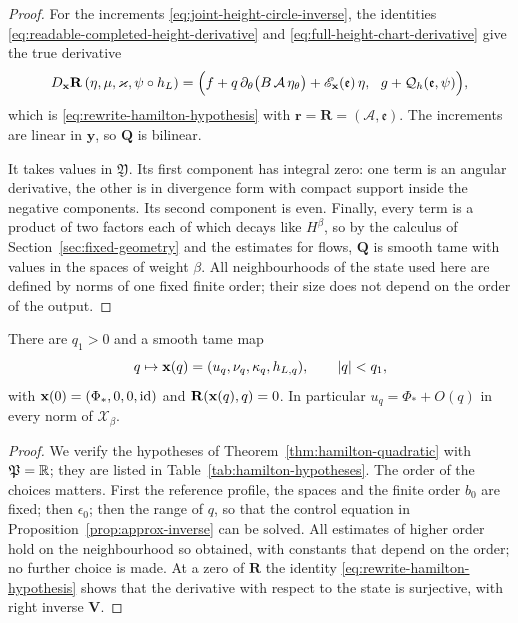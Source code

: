 \begin{proof}
For the increments \eqref{eq:joint-height-circle-inverse}, the
identities \eqref{eq:readable-completed-height-derivative} and
\eqref{eq:full-height-chart-derivative} give the true derivative
\begin{equation}\label{eq:joint-height-circle-quadratic-error}
 D_{\mathbf x}\mathbf R\,(\eta,\mu,\varkappa,\psi\circ h_L)
 =\Bigl(f+q\,\partial_\theta\bigl(B\,\mathcal A\,\eta_\theta\bigr)
              +\mathscr E_{\mathbf x}(\mathfrak e)\,\eta,\ \
        g+\mathcal Q_h(\mathfrak e,\psi)\Bigr),
\end{equation}
which is \eqref{eq:rewrite-hamilton-hypothesis} with
$\mathbf r=\mathbf R=(\mathcal A,\mathfrak e)$. The increments are
linear in $\mathbf y$, so $\mathbf Q$ is bilinear.

It takes values in $\mathfrak Y$. Its first component has integral
zero: one term is an angular derivative, the other is in divergence
form with compact support inside the negative components. Its second
component is even. Finally, every term is a product of two factors
each of which decays like $H^\beta$, so by the calculus of
Section~\ref{sec:fixed-geometry} and the estimates for flows,
$\mathbf Q$ is smooth tame with values in the spaces of weight
$\beta$. All neighbourhoods of the state used here are defined by
norms of one fixed finite order; their size does not depend on the
order of the output.
\end{proof}

\begin{theorem}\label{thm:weak-branch}
There are $q_1>0$ and a smooth tame map
\begin{equation}\label{eq:rewrite-weak-branch}
 q\mapsto\mathbf x(q)=(u_q,\nu_q,\kappa_q,h_{L,q}),\qquad |q|<q_1,
\end{equation}
with $\mathbf x(0)=(\Phi_*,0,0,\mathrm{id})$ and
$\mathbf R(\mathbf x(q),q)=0$. In particular
$u_q=\Phi_*+O(q)$ in every norm of $\mathcal X_\beta$.
\end{theorem}

\begin{proof}
We verify the hypotheses of
Theorem~\ref{thm:hamilton-quadratic} with $\mathfrak P=\mathbb R$; they are
listed in Table~\ref{tab:hamilton-hypotheses}. The order of the
choices matters. First the reference profile, the spaces and the
finite order $b_0$ are fixed; then $\epsilon_0$; then the range of
$q$, so that the control equation in
Proposition~\ref{prop:approx-inverse} can be solved. All estimates of
higher order hold on the neighbourhood so obtained, with constants
that depend on the order; no further choice is made. At a zero of
$\mathbf R$ the identity \eqref{eq:rewrite-hamilton-hypothesis} shows
that the derivative with respect to the state is surjective, with
right inverse $\mathbf V$.
\end{proof}

